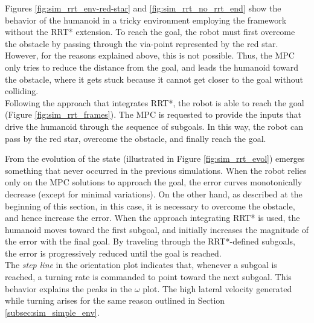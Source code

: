 Figures \ref{fig:sim_rrt_env-red-star} and \ref{fig:sim_rrt_no_rrt_end} show the behavior of the humanoid in a tricky environment employing the framework without the RRT* extension. To reach the goal, the robot must first overcome the obstacle by passing through the via-point represented by the red star. However, for the reasons explained above, this is not possible. Thus, the MPC only tries to reduce the distance from the goal, and leads the humanoid toward the obstacle, where it gets stuck because it cannot get closer to the goal without colliding.\\
Following the approach that integrates RRT*, the robot is able to reach the goal (Figure \ref{fig:sim_rrt_frames}). The MPC is requested to provide the inputs that drive the humanoid through the sequence of subgoals. In this way, the robot can pass by the red star, overcome the obstacle, and finally reach the goal.

From the evolution of the state (illustrated in Figure \ref{fig:sim_rrt_evol}) emerges something that never occurred in the previous simulations. When the robot relies only on the MPC solutions to approach the goal, the error curves monotonically decrease (except for minimal variations). On the other hand, as described at the beginning of this section, in this case, it is necessary to overcome the obstacle, and hence increase the error. When the approach integrating RRT* is used, the humanoid moves toward the first subgoal, and initially increases the magnitude of the error with the final goal. By traveling through the RRT*-defined subgoals, the error is progressively reduced until the goal is reached.\\
The \textit{step line} in the orientation plot indicates that, whenever a subgoal is reached, a turning rate is commanded to point toward the next subgoal. This behavior explains the peaks in the $\omega$ plot. The high lateral velocity generated while turning arises for the same reason outlined in Section \ref{subsec:sim_simple_env}.



